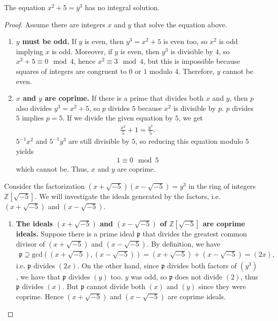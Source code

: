 \begin{example}
    The equation \(x^2 + 5 = y^3\) has no integral solution.
\end{example}
\begin{proof}
    Assume there are integers \(x\) and \(y\) that solve the equation above.
    \begin{enumerate}
        \item \textbf{\(y\) must be odd.} If \(y\) is even, then \(y^3 = x^2 + 5\) is even too, so \(x^2\) is odd implying \(x\) is odd. Moreover, if \(y\) is even, then \(y^3\) is divisible by \(4\), so \(x^2 + 5 \equiv 0 \mod{4}\), hence \(x^2 \equiv 3 \mod{4}\), but this is impossible because squares of integers are congruent to \(0\) or \(1\) modulo \(4\). Therefore, \(y\) cannot be even.
        \item \textbf{\(x\) and \(y\) are coprime.} If there is a prime that divides both \(x\) and \(y\), then \(p\) also divides \(y^3 = x^2 + 5\), so \(p\) divides \(5\) because \(x^2\) is divisible by \(p\). \(p\) divides \(5\) implies \(p = 5\). If we divide the given equation by \(5\), we get
        \begin{align*}
            \frac{x^2}{5} + 1 = \frac{y^3}{5} \text{.}
        \end{align*}
        \(5^{-1} x^2\) and \(5^{-1} y^3\) are still divisible by \(5\), so reducing this equation modulo \(5\) yields
        \begin{align*}
            1 \equiv 0 \mod{5}
        \end{align*}
        which cannot be. Thus, \(x\) and \(y\) are coprime.
    \end{enumerate}
    Consider the factorization \((x + \sqrt{-5})(x - \sqrt{-5}) = y^3\) in the ring of integers \(\mathbb{Z}[\sqrt{-5}]\). We will investigate the ideals generated by the factors, i.e. \((x + \sqrt{-5})\) and \((x - \sqrt{-5})\).
    \begin{enumerate}[resume]
        \item \textbf{The ideals \((x + \sqrt{-5})\) and \((x - \sqrt{-5})\) of \(\mathbb{Z}[\sqrt{-5}]\) are coprime ideals.} Suppose there is a prime ideal \(\mathfrak{p}\) that divides the greatest common divisor of \((x + \sqrt{-5})\) and \((x - \sqrt{-5})\). By definition, we have
        \begin{align*}
            \mathfrak{p} \supseteq \mathrm{gcd}( (x + \sqrt{-5}),  (x - \sqrt{-5})) = (x + \sqrt{-5}) + (x - \sqrt{-5}) = (2x) \text{,}
        \end{align*}
        i.e. \(\mathfrak{p}\) divides \((2x)\). On the other hand, since \(\mathfrak{p}\) divides both factors of \((y^3)\), we have that \(\mathfrak{p}\) divides \((y)\) too. \(y\) was odd, so \(\mathfrak{p}\) does not divide \((2)\), thus \(\mathfrak{p}\) divides \((x)\). But \(\mathfrak{p}\) cannot divide both \((x)\) and \((y)\) since they were coprime. Hence \((x + \sqrt{-5})\) and \((x - \sqrt{-5})\) are coprime ideals.

\end{enumerate}
\end{proof}
